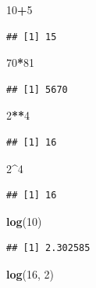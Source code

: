 \documentclass[]{book}
\newenvironment{Shaded}{\begin{snugshade}}{\end{snugshade}}
\newcommand{\KeywordTok}[1]{\textcolor[rgb]{0.13,0.29,0.53}{\textbf{#1}}}
\newcommand{\DecValTok}[1]{\textcolor[rgb]{0.00,0.00,0.81}{#1}}
\newcommand{\OperatorTok}[1]{\textcolor[rgb]{0.81,0.36,0.00}{\textbf{#1}}}
\newcommand{\NormalTok}[1]{#1}
\theoremstyle{definition}
\theoremstyle{definition}
\theoremstyle{definition}
\theoremstyle{remark}
\begin{document}
\begin{Shaded}
\begin{Highlighting}[]
\DecValTok{10}\OperatorTok{+}\DecValTok{5} 
\end{Highlighting}
\end{Shaded}

\begin{verbatim}
## [1] 15
\end{verbatim}

\begin{Shaded}
\begin{Highlighting}[]
\DecValTok{70}\OperatorTok{*}\DecValTok{81}
\end{Highlighting}
\end{Shaded}

\begin{verbatim}
## [1] 5670
\end{verbatim}

\begin{Shaded}
\begin{Highlighting}[]
\DecValTok{2}\OperatorTok{**}\DecValTok{4}
\end{Highlighting}
\end{Shaded}

\begin{verbatim}
## [1] 16
\end{verbatim}

\begin{Shaded}
\begin{Highlighting}[]
\DecValTok{2}\OperatorTok{^}\DecValTok{4}
\end{Highlighting}
\end{Shaded}

\begin{verbatim}
## [1] 16
\end{verbatim}

\begin{Shaded}
\begin{Highlighting}[]
\KeywordTok{log}\NormalTok{(}\DecValTok{10}\NormalTok{)                         }
\end{Highlighting}
\end{Shaded}

\begin{verbatim}
## [1] 2.302585
\end{verbatim}

\begin{Shaded}
\begin{Highlighting}[]
\KeywordTok{log}\NormalTok{(}\DecValTok{16}\NormalTok{, }\DecValTok{2}\NormalTok{)                      }
\end{Highlighting}
\end{Shaded}
\end{document}
